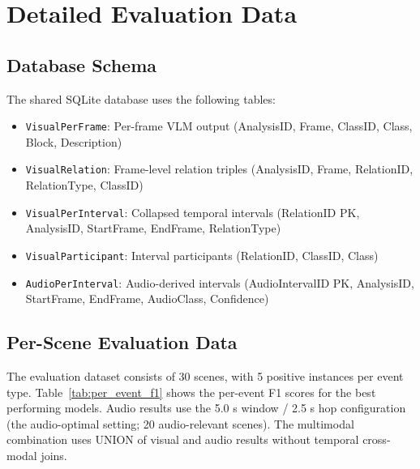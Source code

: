 \section{Detailed Evaluation Data}

\subsection{Database Schema}

The shared SQLite database uses the following tables:

\begin{itemize}
  \item \texttt{VisualPerFrame}: Per-frame VLM output (AnalysisID, Frame, ClassID, Class, Block, Description)
  \item \texttt{VisualRelation}: Frame-level relation triples (AnalysisID, Frame, RelationID, RelationType, ClassID)
  \item \texttt{VisualPerInterval}: Collapsed temporal intervals (RelationID PK, AnalysisID, StartFrame, EndFrame, RelationType)
  \item \texttt{VisualParticipant}: Interval participants (RelationID, ClassID, Class)
  \item \texttt{AudioPerInterval}: Audio-derived intervals (AudioIntervalID PK, AnalysisID, StartFrame, EndFrame, AudioClass, Confidence)
\end{itemize}

\subsection{Per-Scene Evaluation Data}

The evaluation dataset consists of 30 scenes, with 5 positive instances per event type. Table~\ref{tab:per_event_f1} shows the per-event F1 scores for the best performing models. Audio results use the 5.0 s window / 2.5 s hop configuration (the audio-optimal setting; 20 audio-relevant scenes). The multimodal combination uses UNION of visual and audio results without temporal cross-modal joins.

